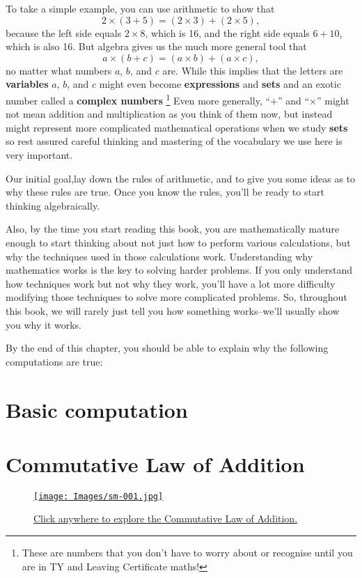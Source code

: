  



To take a simple example, you can use arithmetic to show that\[ 2 \times (3 + 5) = (2 \times 3) + (2 \times 5), \]because the left side equals $2 \times 8$, which is 16, and the right side equals $6 + 10$, which is also 16. But algebra gives us the much more general tool that\[ a \times (b + c) = (a \times b) + (a \times c), \]no matter what numbers $a$, $b$, and $c$ are. While this implies that the letters are \textbf{variables} $a$, $b$, and $c$ might even become \textbf{expressions} and    \textbf{sets} and an exotic number called a \textbf{complex numbers} \footnote{These are numbers that you don't have to worry about or recognise until you are in TY and Leaving Certificate maths!} Even more generally, “$+$” and “$\times$” might not mean addition and multiplication as you think of them now, but instead might represent more complicated mathematical operations when we study \textbf{sets}  so rest assured careful thinking and mastering of the vocabulary we use here is very important.

Our initial goal,lay down the rules of arithmetic, and to give you some ideas as to why these rules are true. Once you know the rules, you’ll be ready to start thinking algebraically.

Also, by the time you start reading this book, you are mathematically mature enough to start thinking about not just how to perform various calculations, but why the techniques used in those calculations work. Understanding why mathematics works is the key to solving harder problems. If you only understand how techniques work but not why they work, you’ll have a lot more difficulty modifying those techniques to solve more complicated problems. So, throughout this book, we will rarely just tell you how something works–we’ll usually show you why it works.

By the end of this chapter, you should be able to explain why the following computations are true:

\section{Basic computation}




\section{Commutative Law of Addition}


\begin{figure*}[h!]
   \centering
    \href{https://www.geogebra.org/m/CsDdkudm}{\texttt{[image: Images/sm-001.jpg]}}
    \caption{\href{https://www.geogebra.org/m/CsDdkudm}{Click anywhere to explore the Commutative Law of Addition.}}
\end{figure*}















